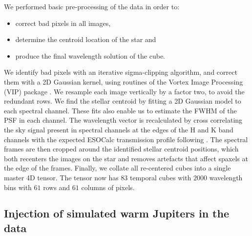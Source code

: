 \documentclass{aa}
\begin{document}
We performed basic pre-processing of the data in order to:
\begin{itemize}
    \item correct bad pixels in all images,
    \item determine the centroid location of the star and
    \item produce the final wavelength solution of the cube. 
\end{itemize}
We identify bad pixels with an iterative sigma-clipping algorithm, and correct them with a 2D Gaussian kernel, using routines of the Vortex Image Processing (\textsc{VIP}) package \citep{2017AJGomezVIP,2023Christiaens}.
We resample each image vertically by a factor two, to avoid the redundant rows. 
We find the stellar centroid by fitting a 2D Gaussian model to each spectral channel. 
These fits also enable us to estimate the FWHM of the PSF in each channel. 
The wavelength vector is recalculated by cross correlating the sky signal present in spectral channels at the edges of the H and K band channels with the expected ESOCalc transmission profile following \cite{2018AHoeijmakersMM}. 
The spectral frames are then cropped around the identified stellar centroid positions, which both recenters the images on the star and removes artefacts that affect spaxels at the edge of the frames.
Finally, we collate all re-centered cubes into a single master 4D tensor.
The tensor now has $83$ temporal cubes with $2000$ wavelength bins with $61$ rows and $61$ columns of pixels.

\subsection{Injection of simulated warm Jupiters in the data}\label{sec: FC insertion}
\end{document}
